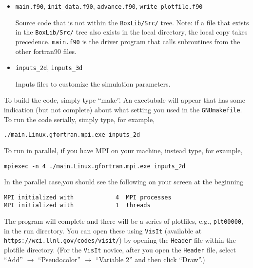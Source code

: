 \begin{itemize}
\item {\tt main.f90}, {\tt init\_data.f90}, {\tt advance.f90}, {\tt write\_plotfile.f90}

Source code that is not within the {\tt BoxLib/Src/} tree.  Note: if a file that exists in the
{\tt BoxLib/Src/} tree also exists in the local directory, the local copy takes precedence.
{\tt main.f90} is the driver program that calls subroutines from the other fortran90 files.

\item {\tt inputs\_2d}, {\tt inputs\_3d}

Inputs files to customize the simulation parameters.

\end{itemize}

To build the code, simply type ``make''.  An exectubale will appear that has some indication (but not complete)
about what setting you used in the {\tt GNUmakefile}.  To run the code serially, simply type, for example,
\begin{verbatim}
./main.Linux.gfortran.mpi.exe inputs_2d
\end{verbatim}
To run in parallel, if you have MPI on your machine, instead type, for example,
\begin{verbatim}
mpiexec -n 4 ./main.Linux.gfortran.mpi.exe inputs_2d
\end{verbatim}
In the parallel case,you should see the following on your screen at the beginning
\begin{verbatim}
MPI initialized with            4  MPI processes
MPI initialized with            1  threads
\end{verbatim}
The program will complete and there will be a series of plotfiles, e.g., {\tt plt00000}, in the run directory.
You can open these using {\tt VisIt} (available at {\tt https://wci.llnl.gov/codes/visit/}) by opening
the {\tt Header} file within the plotfile directory.  (For the {\tt VisIt} novice, after you open the {\tt Header}
file, select ``Add'' $\rightarrow$ ``Pseudocolor'' $\rightarrow$ ``Variable 2'' and then click ``Draw''.)

